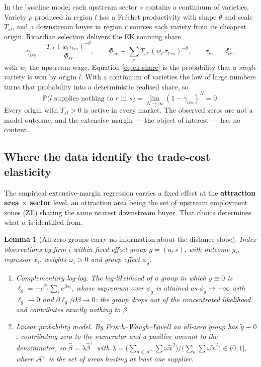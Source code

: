\documentclass[11pt]{article}
\newtheorem{lemma}{Lemma}
\newcommand{\Prob}{\mathbb{P}}
\newcommand{\Areas}{\mathcal{A}}
\begin{document}
In the baseline model each upstream sector $s$ contains a continuum of varieties. Variety $\rho$
produced in region $l$ has a Fr\'echet productivity with shape $\theta$ and scale $T_{sl}$, and a
downstream buyer in region $r$ sources each variety from its cheapest origin. Ricardian selection
delivers the EK sourcing share
\begin{equation}
\gamma_{lrs}
=\frac{T_{sl}\,(w_{l}\tau_{lrs})^{-\theta}}{\Phi_{sr}},
\qquad
\Phi_{sr}\equiv\sum_{l'}T_{sl'}(w_{l'}\tau_{l'rs})^{-\theta},
\qquad
\tau_{lrs}=d_{lr}^{\alpha},
\label{eq:ek-share}
\end{equation}
with $w_{l}$ the upstream wage. Equation \eqref{eq:ek-share} is the probability that a
\emph{single} variety is won by origin $l$. With a continuum of varieties the law of large numbers
turns that probability into a deterministic realised share, so
\begin{equation}
\Prob\big(\text{$l$ supplies nothing to $r$ in $s$}\big)=\lim_{N\to\infty}(1-\gamma_{lrs})^{N}=0 .
\label{eq:degenerate}
\end{equation}
Every origin with $T_{sl}>0$ is active in every market. The observed zeros are not a model
outcome, and the extensive margin --- the object of interest --- has no content.

\subsection{Where the data identify the trade-cost elasticity}
\label{sec:fe}

The empirical extensive-margin regression carries a fixed effect at the \textbf{attraction area
$\times$ sector} level, an attraction area being the set of upstream employment zones (ZE) sharing
the same nearest downstream buyer. That choice determines what $\alpha$ is identified from.

\begin{lemma}[All-zero groups carry no information about the distance slope]
\label{lem:fe}
Index observations by firm $i$ within fixed-effect group $g=(a,s)$, with outcome $y_{i}$,
regressor $x_{i}$, weights $\omega_{i}>0$ and group effect $\phi_{g}$.
\begin{enumerate}[nosep,topsep=2pt,label=(\roman*)]
\item \emph{Complementary log-log.} The log-likelihood of a group in which $y\equiv0$ is
$\ell_{g}=-e^{\phi_{g}}\sum_{i}e^{\beta x_{i}}$, whose supremum over $\phi_{g}$ is attained as
$\phi_{g}\to-\infty$ with $\ell_{g}\to0$ and $\partial\ell_{g}/\partial\beta\to0$: the group drops
out of the concentrated likelihood and contributes \emph{exactly nothing} to $\hat\beta$.
\item \emph{Linear probability model.} By Frisch--Waugh--Lovell an all-zero group has
$\tilde y\equiv0$, contributing zero to the numerator and a positive amount to the denominator, so
$\hat\beta=\lambda\hat\beta^{+}$ with
$\lambda=\big(\sum_{a\in\Areas^{+}}\sum\omega\tilde x^{2}\big)/\big(\sum_{a}\sum\omega\tilde x^{2}\big)\in(0,1]$,
where $\Areas^{+}$ is the set of areas hosting at least one supplier.
\end{enumerate}
\end{lemma}
\end{document}
